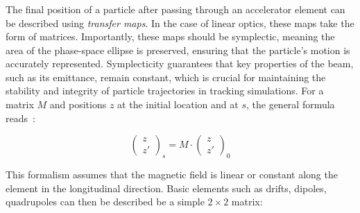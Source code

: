 \subsubsection{}
\label{section:coordinate_systems:linear_maps}

The final position of a particle after passing through an accelerator element can be described using
\textit{transfer maps}. In the case of linear optics, these maps take the form of matrices.
Importantly, these maps should be symplectic, meaning the area of the phase-space ellipse is
preserved, ensuring that the particle's motion is accurately represented. Symplecticity guarantees
that key properties of the beam, such as its emittance, remain constant, which is crucial for
maintaining the stability and integrity of particle trajectories in tracking simulations.
For a matrix $M$ and positions $z$ at the initial location and at $s$, the general formula
reads~\cite{lee_accelerator_2004}:

\begin{equation}
    \begin{pmatrix}
        z \\
        z'
    \end{pmatrix}_s
    = M \cdot 
    \begin{pmatrix}
        z \\
        z'
    \end{pmatrix}_0
\end{equation}

This formalism assumes that the magnetic field is linear or constant along the element in the
longitudinal direction. Basic elements such as drifts, dipoles, quadrupoles can then be described be
a simple $2 \times 2$ matrix:

